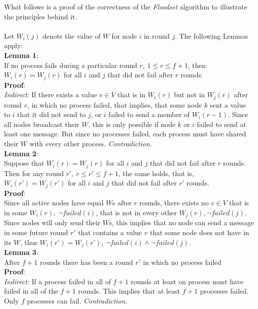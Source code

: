 \documentclass[fleqn]{article}
\begin{document}
\noindent What follows is a proof of the correctness of the \textit{Floodset} algorithm to illustrate the principles behind it.\\
\\
\noindent Let $W_i(j)$ denote the value of $W$ for node $i$ in round $j$. The following Lemmas apply:\\

\noindent \textbf{Lemma 1}:\\
If no process fails during a particular round $r,\ 1 \le r \le f + 1$, then $W_i(r) = W_j(r)$ for all $i$ and $j$ that did not fail after $r$ rounds.\\
\textbf{Proof}:\\
\textit{Indirect}: If there exists a value $v \in V$ that is in $W_i(r)$ but not in $W_j(r)$ after round $r$, in which no process failed, that implies, that some node $k$ sent a value to $i$ that it did not send to $j$, or $i$ failed to send a member of $W_i(r-1)$. Since all nodes broadcast their $W$, this is only possible if node $k$ or $i$ failed to send at least one message. But since no processes failed, each process must have shared their $W$ with every other process. \textit{Contradiction}. \\

\noindent \textbf{Lemma 2}:\\
Suppose that $W_i(r) = W_j(r)$ for all $i$ and $j$ that did not fail after $r$ rounds. Then for any round $r',\ r \le r' ≤ f + 1$, the same holds, that is, $W_i(r’) = W_j(r’)$ for all $i$ and $j$ that did not fail after $r’$ rounds.\\
\textbf{Proof}:\\
Since all active nodes have equal $W$s after $r$ rounds, there exists no $v \in V$ that is in some $W_i(r),\ \neg failed(i)$, that is not in every other $W_j(r), \neg failed(j)$.
Since nodes will only send their $W$s, this implies that no node can send a message in some future round $r'$ that contains a value $v$ that some node does not have in its $W$, thus $W_i(r’) = W_j(r’)$, $\neg failed(i) \land \neg failed(j)$.\\

\noindent \textbf{Lemma 3}:\\
After $f+1$ rounds there has been a round $r'$ in which no process failed\\
\textbf{Proof}:\\
\textit{Indirect:} If a process failed in all of $f+1$ rounds at least on process must have failed in all of the $f+1$ rounds. This implies
that at least $f+1$ processes failed. Only $f$ processes can fail. \textit{Contradiction}.\\
\end{document}
